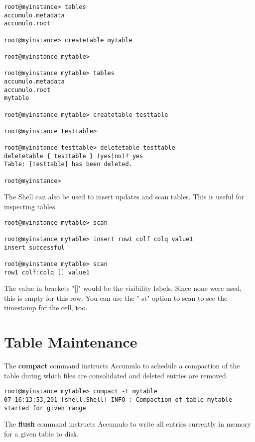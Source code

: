 \begingroup\fontsize{8pt}{8pt}\selectfont\begin{verbatim}
root@myinstance> tables
accumulo.metadata
accumulo.root

root@myinstance> createtable mytable

root@myinstance mytable>

root@myinstance mytable> tables
accumulo.metadata
accumulo.root
mytable

root@myinstance mytable> createtable testtable

root@myinstance testtable>

root@myinstance testtable> deletetable testtable
deletetable { testtable } (yes|no)? yes
Table: [testtable] has been deleted. 

root@myinstance>
\end{verbatim}\endgroup

The Shell can also be used to insert updates and scan tables. This is useful for
inspecting tables.

\begingroup\fontsize{8pt}{8pt}\selectfont\begin{verbatim}
root@myinstance mytable> scan

root@myinstance mytable> insert row1 colf colq value1
insert successful

root@myinstance mytable> scan
row1 colf:colq [] value1
\end{verbatim}\endgroup

The value in brackets "[]" would be the visibility labels. Since none were used, this is empty for this row.
You can use the "-st" option to scan to see the timestamp for the cell, too.

\section{Table Maintenance}

The \textbf{compact} command instructs Accumulo to schedule a compaction of the table during which
files are consolidated and deleted entries are removed.

\begingroup\fontsize{8pt}{8pt}\selectfont\begin{verbatim}
root@myinstance mytable> compact -t mytable
07 16:13:53,201 [shell.Shell] INFO : Compaction of table mytable started for given range
\end{verbatim}\endgroup

The \textbf{flush} command instructs Accumulo to write all entries currently in memory for a given table
to disk.

